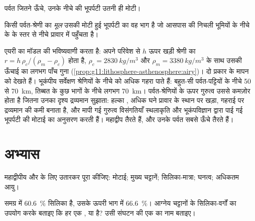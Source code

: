 पर्वत जितने ऊँचे, उनके नीचे की भूपर्पटी उतनी ही मोटी।

\begin{definition}[पर्वत-मूल]\label{def:g12:continental-crust:root}
किसी पर्वत-श्रेणी का \emph{मूल} उसकी
मोटी हुई भूपर्पटी का वह भाग है जो आसपास की निचली भूमियों के नीचे के  के
स्तर से नीचे प्रावार में पहुँचता है।
\end{definition}

एयरी का मॉडल  की भविष्यवाणी करता है: अपने परिवेश से $h$ ऊपर खड़ी
श्रेणी का  $r = h\,\rho_c/(\rho_m - \rho_c)$ होता है, $\rho_c = \qty{2830}{kg/m^3}$ और $\rho_m =
\qty{3380}{kg/m^3}$ के साथ उसकी ऊँचाई का लगभग पाँच गुना
(\cref{prop:g11:lithosphere-asthenosphere:airy})। दो
प्रकार के मापन  को देखते हैं। भूकंपीय सर्वेक्षण श्रेणियों के नीचे  को अधिक
गहरा पाते हैं: बहुत-सी पर्वत-पट्टियों के नीचे 50 से \qty{70}{km}, तिब्बत के कुछ भागों के नीचे लगभग
\qty{70}{km}। पर्वत-श्रेणियों के ऊपर गुरुत्व उससे कमज़ोर होता है जितना
उनका दृश्य द्रव्यमान सुझाता: हल्का , अधिक घने प्रावार के स्थान पर खड़ा,
गहराई पर द्रव्यमान की कमी बनाता है, और मापी गई गुरुत्व
विसंगतियाँ स्थलाकृति और भूकंपविज्ञान द्वारा पाई गई भूपर्पटी की मोटाई का
अनुसरण करती हैं। महाद्वीप तैरते हैं, और उनके पर्वत सबसे ऊँचे तैरते हैं।

\section{अभ्यास}

\begin{exercise}[$\star$]\label{exo:g12:continental-crust:1}
महाद्वीपीय और  के लिए उतारकर पूरा कीजिए: मोटाई;
मुख्य चट्टानें; सिलिका-मात्रा; घनत्व; अधिकतम आयु।
\end{exercise}

\begin{exercise}[$\star$]\label{exo:g12:continental-crust:2}
समग्र  में \qty{60.6}{\percent} सिलिका है, उसके ऊपरी
भाग में \qty{66.6}{\percent}। आग्नेय चट्टानों के सिलिका-वर्गों का उपयोग करके बताइए कि
हर एक ,  या  है? उसी संघटन की एक  का
नाम बताइए।
\end{exercise}

